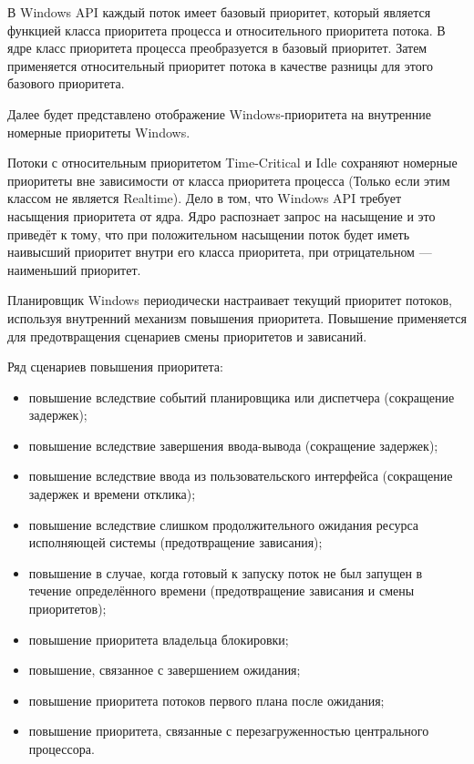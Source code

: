 В Windows API каждый поток имеет базовый приоритет, который является
функцией класса приоритета процесса и относительного приоритета потока. 
В ядре класс приоритета процесса преобразуется в базовый приоритет. Затем
применяется относительный приоритет потока в качестве разницы для этого 
базового приоритета.

Далее будет представлено отображение Windows-приоритета на внутренние
номерные приоритеты Windows.


Потоки с относительным приоритетом Time-Critical и Idle сохраняют
номерные приоритеты вне зависимости от класса приоритета процесса (Только
если этим классом не является Realtime). Дело в том, что Windows API
требует насыщения приоритета от ядра. Ядро распознает запрос на насыщение 
и это приведёт к тому, что при положительном насыщении поток будет иметь
наивысший приоритет внутри его класса приоритета, при отрицательном --- 
наименьший приоритет.

Планировщик Windows периодически настраивает текущий приоритет 
потоков, используя внутренний механизм повышения приоритета. 
Повышение применяется для предотвращения сценариев смены 
приоритетов и зависаний.

Ряд сценариев повышения приоритета:
\begin{itemize}
  \item повышение вследствие событий планировщика или диспетчера (сокращение задержек);
  \item повышение вследствие завершения ввода-вывода (сокращение задержек);
  \item повышение вследствие ввода из пользовательского интерфейса (сокращение задержек и времени отклика);
  \item повышение вследствие слишком продолжительного 
  ожидания ресурса исполняющей системы (предотвращение зависания);
  \item повышение в случае, когда готовый к запуску поток не был запущен в 
  течение определённого времени (предотвращение зависания и смены приоритетов);
  \item повышение приоритета владельца блокировки;
  \item повышение, связанное с завершением ожидания;
  \item повышение приоритета потоков первого плана после ожидания;
  \item повышение приоритета, связанные с перезагруженностью центрального процессора.
\end{itemize}

